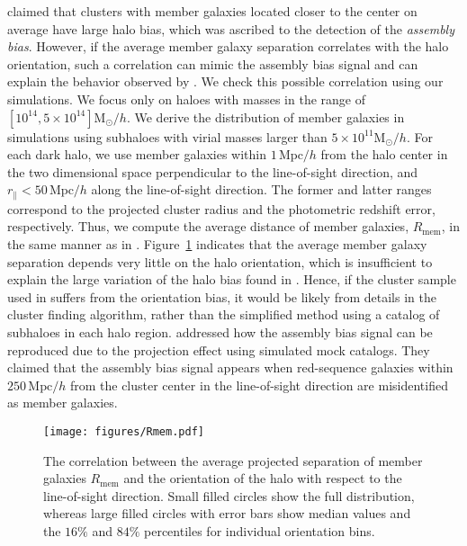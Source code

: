 \documentclass[a4paper,fleqn,usenatbib]{mnras}
\newcommand{\Mpc}{\mathrm{Mpc}}
\newcommand{\Msun}{\mathrm{M}_\odot}
\begin{document}
\citet{Miyatake2016} claimed that clusters with member galaxies
located closer to the center on average have large halo bias, which
was ascribed to the detection of the {\it assembly bias}.
However, if the average member galaxy separation correlates with the
halo orientation, such a correlation can mimic the assembly bias
signal and can explain the behavior observed by \citet{Miyatake2016}.
We check this possible correlation using our simulations. We focus
only on haloes with masses in the range of $[10^{14}, 5 \times 10^{14}] \Msun /h$.
We derive the distribution of member galaxies in
simulations using subhaloes with virial masses larger than $5 \times 10^{11} \Msun/h$.
For each dark halo, we use member galaxies within
$1\,\Mpc/h$ from the halo center in the two dimensional space
perpendicular to the line-of-sight direction, and $r_\parallel < 50\,\Mpc/h$
along the line-of-sight direction.
The former and latter ranges correspond to the projected cluster
radius and the photometric redshift error, respectively.
Thus, we compute the average distance of member galaxies,
$R_\mathrm{mem}$, in the same manner as in \citet{Miyatake2016}.
Figure~\ref{fig:Rmem} indicates that the average member galaxy
separation depends very little on the halo orientation, which is
insufficient to explain the large variation of the halo bias found in
\citet{Miyatake2016}.
Hence, if the cluster sample used in \citet{Miyatake2016}
suffers from the orientation bias,
it would be likely from details in the cluster finding algorithm, rather than
the simplified method using a catalog of subhaloes in each halo region.
\citet{Busch2017} addressed how the assembly bias signal
can be reproduced due to the projection effect
using simulated mock catalogs.
They claimed that the assembly bias signal appears when red-sequence galaxies
within $250 \, \Mpc /h$ from the cluster center in the line-of-sight direction
are misidentified as member galaxies.

\begin{figure}
\texttt{[image: figures/Rmem.pdf]}
\caption{The correlation between the average projected separation of
member galaxies $R_\mathrm{mem}$ \citep[see][]{Miyatake2016} and the
orientation of the halo with respect to the line-of-sight
direction. Small filled circles show the full distribution, whereas
large filled circles with error bars show median values and the $16\%$
and $84\%$ percentiles for individual orientation bins.}
\label{fig:Rmem}
\end{figure}
\end{document}
